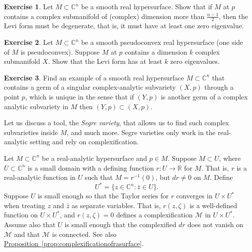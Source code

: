 \documentclass[12pt,openany]{book}
\newcommand{\C}{{\mathbb{C}}}
\newcommand{\R}{{\mathbb{R}}}
\newcommand{\sM}{{\mathscr{M}}}
\newcommand{\myindex}[1]{#1\index{#1}}
\theoremstyle{plain}
\theoremstyle{remark}
\theoremstyle{definition}
\newenvironment{exbox}{%
    \def\FrameCommand{\vrule width 1pt \relax\hspace{10pt}}%
    \MakeFramed{\advance\hsize-\width\FrameRestore}%
}{%
    \endMakeFramed
}
\theoremstyle{exercise}
\newtheorem{exercise}{Exercise}[section]
\theoremstyle{example}
\newcommand{\propref}[1]{\hyperref[#1]{Proposition~\ref*{#1}}}
\begin{document}
\begin{exbox}
\begin{exercise}
Let $M \subset \C^n$ be a smooth real hypersurface.
Show that if $M$ at $p$ contains a complex submanifold of (complex)
dimension more than
$\frac{n-1}{2}$, then the Levi form must be degenerate, that is, it must
have at least one zero eigenvalue.
\end{exercise}

\begin{exercise}
Let $M \subset \C^n$ be a smooth pseudoconvex real hypersurface
(one side of $M$ is pseudoconvex).
Suppose $M$ at $p$ contains a dimension $k$ complex submanifold $X$.
Show that the Levi form has at least $k$ zero eigenvalues.
\end{exercise}

\begin{exercise}
Find an example of a smooth real hypersurface $M \subset \C^n$ that contains a
germ of a singular complex-analytic subvariety $(X,p)$ through a point $p$,
which is unique in the sense that if $(Y,p)$ is another germ of a complex
analytic subvariety in $M$ then $(Y,p) \subset (X,p)$.
\end{exercise}
\end{exbox}

Let us discuss a tool, the \emph{\myindex{Segre variety}}, that allows us to
find such complex subvarieties inside $M$, and much more.  Segre varieties only
work in the real-analytic setting and rely on complexification.

Let $M \subset \C^n$ be a real-analytic hypersurface and $p \in M$.
Suppose $M \subset U$,
where $U \subset \C^n$ is a small domain with a defining function $r \colon
U  \to \R$ for $M$.  That is, $r$ is a real-analytic function in $U$ such that
$M = r^{-1}(0)$, but
$dr \not= 0$ on $M$.  Define
%
\begin{equation*}
U^* = \bigl\{ z \in \C^n : \bar{z} \in U \bigr\} .
\end{equation*}
Suppose $U$ is small enough so that the Taylor series for $r$
converges in $U \times U^*$ when treating $z$ and $\bar{z}$ as separate
variables.  That is, $r(z,\zeta)$ is a well-defined function on
$U \times U^*$, and $r(z,\zeta) = 0$ defines a complexification $\sM$
in $U \times U^*$.  Assume also that $U$ is small enough that
the complexified
$dr$ does not vanish on $\sM$ and that $\sM$ is connected.
See also \propref{prop:complexificationofrasurface}.
\end{document}
